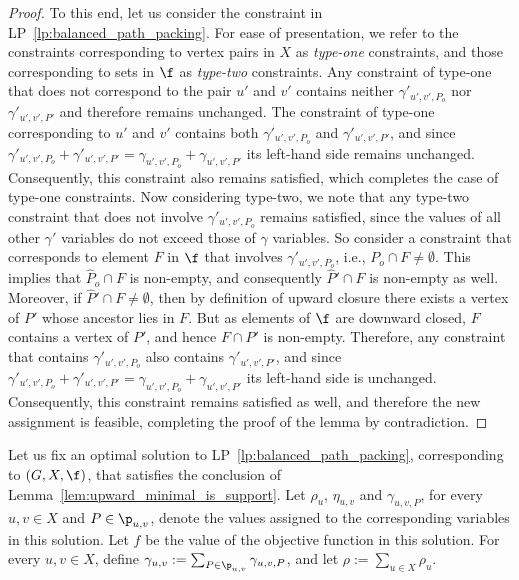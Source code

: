 \begin{proof}
    To this end, let us consider the constraint in LP~\ref{lp:balanced_path_packing}. For ease of presentation, we refer to the constraints corresponding to vertex pairs in $X$ as \emph{type-one} constraints, and those corresponding to sets in $\f$ as \emph{type-two} constraints.
    Any constraint of type-one that does not correspond to the pair $u'$ and $v'$ contains neither $\gamma'_{u',v',P_o}$ nor $\gamma'_{u',v',P'}$ and therefore remains unchanged. The constraint of type-one corresponding to $u'$ and $v'$ contains both $\gamma'_{u',v',P_o}$ and $\gamma'_{u',v',P'}$, and since $\gamma'_{u',v',P_o} + \gamma'_{u',v',P'} = \gamma_{u',v',P_o} + \gamma_{u',v',P'}$ its left-hand side remains unchanged. Consequently, this constraint also remains satisfied, which completes the case of type-one constraints. 
    Now considering type-two, we note that any type-two constraint that does not involve $\gamma'_{u',v',P_o}$ remains satisfied, since the values of all other $\gamma'$ variables do not exceed those of $\gamma$ variables. So consider a constraint that corresponds to element $F$ in $\f$ that involves $\gamma'_{u',v',P_o}$, i.e., $P_o \cap F \neq \emptyset$. This implies that $\widehat{P}_o \cap F$ is non-empty, and consequently $\widehat{P}' \cap F$ is non-empty as well. Moreover, if $\widehat{P}' \cap F\neq\emptyset$, then by definition of upward closure there exists a vertex of $P'$ whose ancestor lies in $F$. But as elements of $\f$ are downward closed, $F$ contains a vertex of $P'$, and hence $F \cap P'$ is non-empty. Therefore, any constraint that contains $\gamma'_{u',v',P_o}$ also contains $\gamma'_{u',v',P'}$, and since $\gamma'_{u',v',P_o} + \gamma'_{u',v',P'} = \gamma_{u',v',P_o} + \gamma_{u',v',P'}$ its left-hand side is unchanged. Consequently, this constraint remains satisfied as well, and therefore the new assignment is feasible, completing the proof of the lemma by contradiction.
\end{proof}

Let us fix an optimal solution to LP~\ref{lp:balanced_path_packing}, corresponding to $(G, X, \f)$, that satisfies the conclusion of Lemma~\ref{lem:upward_minimal_is_support}. Let $\rho_u$, $\eta_{u,v}$ and $\gamma_{u,v,P}$, for every $u,v \in X$ and $P \in \p_{u,v}$, denote the values assigned to the corresponding variables in this solution. Let $f$ be the value of the objective function in this solution. For every $u, v \in X$, define $\gamma_{u,v} := \sum_{P \in \p_{u,v}} \gamma_{u,v,P}$, and let $\rho := \sum_{u \in X} \rho_u$. 


